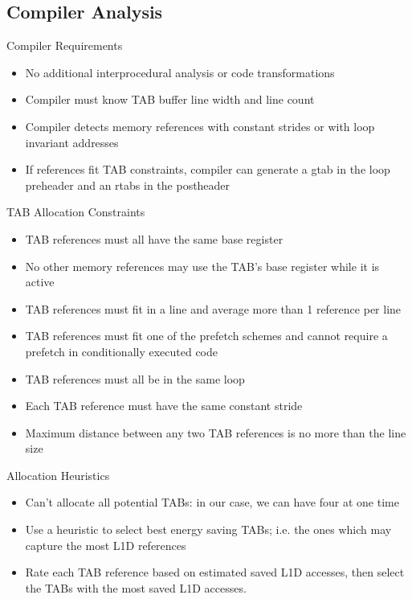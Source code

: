\documentclass{beamer}
\begin{document}
\subsection{Compiler Analysis}
\begin{frame}{Compiler Requirements}
   \begin{itemize}
      \item No additional interprocedural analysis or code transformations
      \item Compiler must know TAB buffer line width and line count
      \item Compiler detects memory references with constant strides or with
         loop invariant addresses
      \item If references fit TAB constraints, compiler can generate a gtab in
         the loop preheader and an rtabs in the postheader
   \end{itemize}
\end{frame}
\begin{frame}{TAB Allocation Constraints}
   \begin{itemize}
      \item TAB references must all have the same base register
      \item No other memory references may use the TAB's base register
         while it is active
      \item TAB references must fit in a line and average more than 1 
         reference per line
      \item TAB references must fit one of the prefetch schemes and cannot require
         a prefetch in conditionally executed code
      \item TAB references must all be in the same loop
      \item Each TAB reference must have the same constant stride
      \item Maximum distance between any two TAB references is no more 
         than the line size
   \end{itemize}
\end{frame}
\begin{frame}{Allocation Heuristics}
   \begin{itemize}
      \item Can't allocate all potential TABs: in our case, we can have 
         four at one time
      \item Use a heuristic to select best energy saving TABs; i.e. the ones which
         may capture the most L1D references
      \item Rate each TAB reference based on estimated saved L1D accesses,
         then select the TABs with the most saved L1D accesses.
   \end{itemize}
\end{frame}
\end{document}
